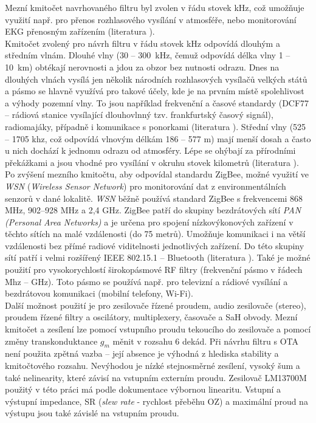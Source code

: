 Mezní kmitočet navrhovaného filtru byl zvolen v řádu stovek kHz, což umožňuje využití např. pro přenos rozhlasového vysílání v atmosféře, nebo monitorování EKG přenosným zařízením (literatura \cite{1}). \\ 
Kmitočet zvolený pro návrh filtru v řádu stovek kHz odpovídá dlouhým a středním vlnám. Dlouhé vlny (30 -- 300~kHz, čemuž odpovídá délka vlny 1 -- 10~km) obtékají nerovnosti a jdou za obzor bez nutnosti odrazu. Dnes na dlouhých vlnách vysílá jen několik národních rozhlasových vysílačů velkých států a pásmo se hlavně využívá pro takové účely, kde je na prvním místě spolehlivost a výhody pozemní vlny. To jsou například frekvenční a časové standardy (DCF77 --  rádiová stanice vysílající dlouhovlnný tzv. frankfurtský časový signál), radiomajáky, případně i komunikace s ponorkami (literatura \cite{2}). Střední vlny (525 -- 1705 khz, což odpovídá vlnovým délkám 186 -- 577 m) mají menší dosah a často u nich dochází k jednomu odrazu od atmosféry. Lépe se ohýbají za přírodními překážkami a jsou vhodné pro vysílání v okruhu stovek kilometrů (literatura \cite{3}). \\
Po zvýšení mezního kmitočtu, aby odpovídal standardu ZigBee, možné využití ve \textit{WSN} (\textit{Wireless Sensor Network}) pro monitorování dat z environmentálních senzorů v dané lokalitě. 
\textit{WSN} běžně používá standard ZigBee s frekvencemi 868 MHz, 902–928 MHz a 2,4 GHz. ZigBee patří do skupiny bezdrátových sítí \textit{PAN (Personal Area Networks)} a je určena pro spojení nízkovýkonových zařízení v těchto sítích na malé vzdálenosti (do 75 metrů). Umožňuje komunikaci i na větší vzdálenosti bez přímé radiové viditelnosti jednotlivých zařízení. Do této skupiny sítí patří i velmi rozšířený IEEE 802.15.1 – Bluetooth (literatura \cite{4}). Také je možné použití pro vysokorychlostí širokopásmové RF filtry (frekvenční pásmo v řádech Mhz -- GHz). Toto pásmo se používá např. pro televizní a rádiové vysílání a bezdrátovou komunikaci (mobilní telefony, Wi-Fi). \\
Další možnost použití je pro zesilovače řízené proudem, audio zesilovače (stereo), proudem řízené filtry a oscilátory, multiplexery, časovače a SaH obvody.
Mezní kmitočet a zesílení lze pomocí vstupního proudu tekoucího do zesilovače a pomocí změny transkonduktance $g_m$ měnit v rozsahu 6 dekád. Při návrhu filtru s OTA není použita zpětná vazba -- její absence je výhodná z hlediska stability a kmitočtového rozsahu. Nevýhodou je nízké stejnosměrné zesílení, vysoký šum a také nelinearity, které závisí na vstupním externím proudu. Zesilovač LM13700M použitý v této práci má podle dokumentace výbornou linearitu. Vstupní a výstupní impedance, SR (\textit{slew rate} - rychlost přeběhu OZ) a maximální proud na výstupu jsou také závislé na vstupním proudu.
